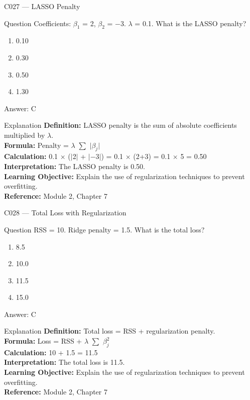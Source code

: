 \documentclass[aspectratio=169,8pt]{beamer}
\begin{document}
	\begin{frame}{C027 --- LASSO Penalty}
		\begin{block}{Question}
			Coefficients: $\beta_1$ = 2, $\beta_2$ = $-$3. $\lambda$ = 0.1. What is the LASSO penalty?
			\begin{enumerate}
				\item 0.10
				\item 0.30
				\item 0.50
				\item 1.30
			\end{enumerate}
		\end{block}
		\begin{exampleblock}{Answer: C}\end{exampleblock}
		\begin{block}{Explanation}
			\textbf{Definition:} LASSO penalty is the sum of absolute coefficients multiplied by $\lambda$.\\
			\textbf{Formula:} Penalty = $\lambda$ $\sum$ $|$$\beta_j$$|$\\
			\textbf{Calculation:} 0.1 $\times$ ($|$2$|$ + $|$$-$3$|$) = 0.1 $\times$ (2+3) = 0.1 $\times$ 5 = 0.50\\
			\textbf{Interpretation:} The LASSO penalty is 0.50.\\
			\textbf{Learning Objective:} Explain the use of regularization techniques to prevent overfitting.\\
			\textbf{Reference:} Module 2, Chapter 7
		\end{block}
	\end{frame}
	
	\begin{frame}{C028 --- Total Loss with Regularization}
		\begin{block}{Question}
			RSS = 10. Ridge penalty = 1.5. What is the total loss?
			\begin{enumerate}
				\item 8.5
				\item 10.0
				\item 11.5
				\item 15.0
			\end{enumerate}
		\end{block}
		\begin{exampleblock}{Answer: C}\end{exampleblock}
		\begin{block}{Explanation}
			\textbf{Definition:} Total loss = RSS + regularization penalty.\\
			\textbf{Formula:} Loss = RSS + $\lambda$ $\sum$ $\beta_j^2$\\
			\textbf{Calculation:} 10 + 1.5 = 11.5\\
			\textbf{Interpretation:} The total loss is 11.5.\\
			\textbf{Learning Objective:} Explain the use of regularization techniques to prevent overfitting.\\
			\textbf{Reference:} Module 2, Chapter 7
		\end{block}
	\end{frame}
	
\end{document}
